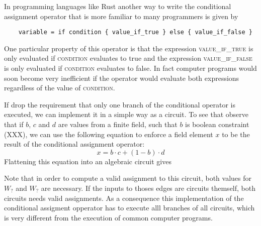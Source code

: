 In programming languages like Rust another way to write the conditional assignment operator that is more familiar to many programmers is given by 
\begin{lstlisting}
	variable = if condition { value_if_true } else { value_if_false } 
\end{lstlisting}
One particular property of this operator is that the expression \textsc{value\_if\_true} is only evaluated if \textsc{condition} evaluates to true and the expression \textsc{value\_if\_false} is only evaluated if \textsc{condition} evaluates to false. In fact computer programs would soon become very inefficient if the operator would evaluate both expressions regardless of the value of \textsc{condition}.

If drop the requirement that only one branch of the conditional operator is executed, we can implement it in a simple way as a circuit. To see that observe that if $b$, $c$ and $d$ are values from a finite field, such that $b$ is boolean constraint (XXX), we can use the following equation to enforce a field element $x$ to be the result of the conditional assignment operator: 
\begin{equation}
x = b\cdot c + (1-b)\cdot d
\end{equation}
Flattening this equation into an algebraic circuit gives
\begin{center}
\end{center}
Note that in order to compute a valid assignment to this circuit, both values for $W_?$ and $W_?$ are necessary. If the inputs to thoses edges are circuits themself, both circuits needs valid assignments. As a consequence this implementation of the conditional assigment opperator has to execute alll branches of all circuits, which is very different from the execution of common computer programs. 

